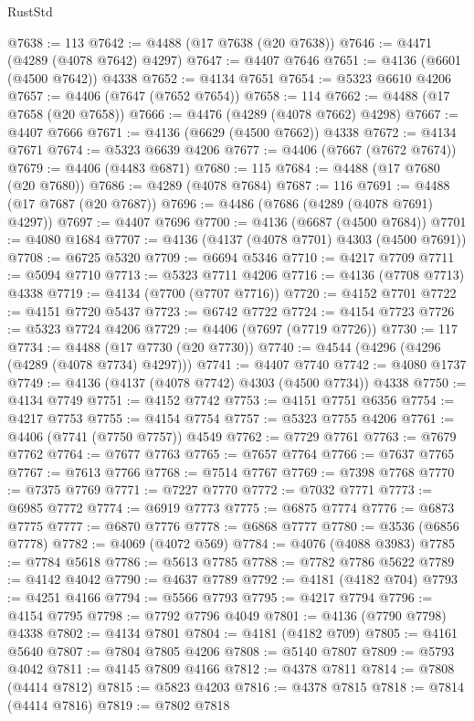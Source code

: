 \begin{lexlean}{RustStd}
\begin{coremodule}
@7638 := 113
@7642 := @4488 (@17 @7638 (@20 @7638))
@7646 := @4471 (@4289 (@4078 @7642) @4297)
@7647 := @4407 @7646
@7651 := @4136 (@6601 (@4500 @7642)) @4338
@7652 := @4134 @7651
@7654 := @5323 @6610 @4206
@7657 := @4406 (@7647 (@7652 @7654))
@7658 := 114
@7662 := @4488 (@17 @7658 (@20 @7658))
@7666 := @4476 (@4289 (@4078 @7662) @4298)
@7667 := @4407 @7666
@7671 := @4136 (@6629 (@4500 @7662)) @4338
@7672 := @4134 @7671
@7674 := @5323 @6639 @4206
@7677 := @4406 (@7667 (@7672 @7674))
@7679 := @4406 (@4483 @6871)
@7680 := 115
@7684 := @4488 (@17 @7680 (@20 @7680))
@7686 := @4289 (@4078 @7684)
@7687 := 116
@7691 := @4488 (@17 @7687 (@20 @7687))
@7696 := @4486 (@7686 (@4289 (@4078 @7691) @4297))
@7697 := @4407 @7696
@7700 := @4136 (@6687 (@4500 @7684))
@7701 := @4080 @1684
@7707 := @4136 (@4137 (@4078 @7701) @4303 (@4500 @7691))
@7708 := @6725 @5320
@7709 := @6694 @5346
@7710 := @4217 @7709
@7711 := @5094 @7710
@7713 := @5323 @7711 @4206
@7716 := @4136 (@7708 @7713) @4338
@7719 := @4134 (@7700 (@7707 @7716))
@7720 := @4152 @7701
@7722 := @4151 @7720 @5437
@7723 := @6742 @7722
@7724 := @4154 @7723
@7726 := @5323 @7724 @4206
@7729 := @4406 (@7697 (@7719 @7726))
@7730 := 117
@7734 := @4488 (@17 @7730 (@20 @7730))
@7740 := @4544 (@4296 (@4296 (@4289 (@4078 @7734) @4297)))
@7741 := @4407 @7740
@7742 := @4080 @1737
@7749 := @4136 (@4137 (@4078 @7742) @4303 (@4500 @7734)) @4338
@7750 := @4134 @7749
@7751 := @4152 @7742
@7753 := @4151 @7751 @6356
@7754 := @4217 @7753
@7755 := @4154 @7754
@7757 := @5323 @7755 @4206
@7761 := @4406 (@7741 (@7750 @7757)) @4549
@7762 := @7729 @7761
@7763 := @7679 @7762
@7764 := @7677 @7763
@7765 := @7657 @7764
@7766 := @7637 @7765
@7767 := @7613 @7766
@7768 := @7514 @7767
@7769 := @7398 @7768
@7770 := @7375 @7769
@7771 := @7227 @7770
@7772 := @7032 @7771
@7773 := @6985 @7772
@7774 := @6919 @7773
@7775 := @6875 @7774
@7776 := @6873 @7775
@7777 := @6870 @7776
@7778 := @6868 @7777
@7780 := @3536 (@6856 @7778)
@7782 := @4069 (@4072 @569)
@7784 := @4076 (@4088 @3983)
@7785 := @7784 @5618
@7786 := @5613 @7785
@7788 := @7782 @7786 @5622
@7789 := @4142 @4042
@7790 := @4637 @7789
@7792 := @4181 (@4182 @704)
@7793 := @4251 @4166
@7794 := @5566 @7793
@7795 := @4217 @7794
@7796 := @4154 @7795
@7798 := @7792 @7796 @4049
@7801 := @4136 (@7790 @7798) @4338
@7802 := @4134 @7801
@7804 := @4181 (@4182 @709)
@7805 := @4161 @5640
@7807 := @7804 @7805 @4206
@7808 := @5140 @7807
@7809 := @5793 @4042
@7811 := @4145 @7809 @4166
@7812 := @4378 @7811
@7814 := @7808 (@4414 @7812)
@7815 := @5823 @4203
@7816 := @4378 @7815
@7818 := @7814 (@4414 @7816)
@7819 := @7802 @7818

\end{coremodule}
\end{lexlean}
